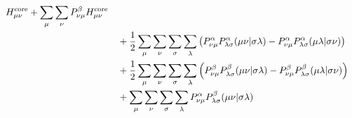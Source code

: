 \begin{align}
		H^{\rm core}_{\mu\nu}
	+
	\sum_\mu
	\sum_\nu
		P^\beta_{\nu\mu}
		H^{\rm core}_{\mu\nu} \nonumber \\ &\quad
	+
	\frac{1}{2}
	\sum_\mu
	\sum_\nu
	\sum_\sigma
	\sum_\lambda\left(
		P^\alpha_{\nu\mu}
		P^\alpha_{\lambda\sigma}
		{(\mu\nu|\sigma\lambda)}
		-
		P^\alpha_{\nu\mu}
		P^\alpha_{\lambda\sigma}
		{(\mu\lambda|\sigma\nu)}
	\right) \nonumber \\ &\quad
	+
	\frac{1}{2}
	\sum_\mu
	\sum_\nu
	\sum_\sigma
	\sum_\lambda\left(
		P^\beta_{\nu\mu}
		P^\beta_{\lambda\sigma}
		{(\mu\nu|\sigma\lambda)}
		-
		P^\beta_{\nu\mu}
		P^\beta_{\lambda\sigma}
		{(\mu\lambda|\sigma\nu)}
	\right) \nonumber \\ &\quad
	+
	\sum_\mu
	\sum_\nu
	\sum_\sigma
	\sum_\lambda
		P^\alpha_{\nu\mu}
		P^\beta_{\lambda\sigma}
		{(\mu\nu|\sigma\lambda)}
\end{align}

